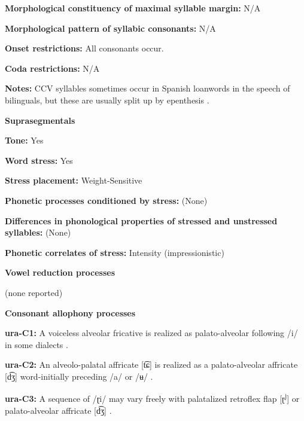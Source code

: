 \textbf{Morphological constituency of maximal syllable margin:} N/A



\textbf{Morphological pattern of syllabic consonants:} N/A



\textbf{Onset restrictions:} All consonants occur.



\textbf{Coda restrictions:} N/A



\textbf{Notes:} CCV syllables sometimes occur in Spanish loanwords in the speech of bilinguals, but these are usually split up by epenthesis \citep[76]{Olawsky2006}.



\textbf{Suprasegmentals}



\textbf{Tone:} Yes



\textbf{Word stress:} Yes



\textbf{Stress placement:} Weight-Sensitive



\textbf{Phonetic processes conditioned by stress:} (None)



\textbf{Differences in phonological properties of stressed and unstressed syllables:} (None)



\textbf{Phonetic correlates of stress:} Intensity (impressionistic)



\textbf{Vowel reduction processes}



(none reported)



\textbf{Consonant allophony processes}



\textbf{ura-C1:} A voiceless alveolar fricative is realized as palato-alveolar following /i/ in some dialects \citep[38]{Olawsky2006}.



\textbf{ura-C2:} An alveolo-palatal affricate [t͡ɕ] is realized as a palato-alveolar affricate [d͡ʒ] word-initially preceding /a/ or /ʉ/ \citep[39]{Olawsky2006}.



\textbf{ura-C3:} A sequence of /ɽi/ may vary freely with palatalized retroflex flap [ɽ\textsuperscript{j}] or palato-alveolar affricate [d͡ʒ] \citep[71]{Olawsky2006}.



